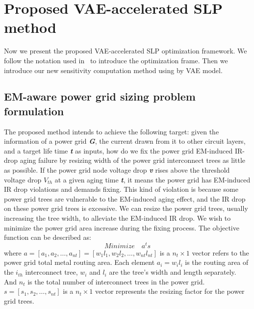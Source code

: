 \section{Proposed VAE-accelerated SLP method}
\label{sec:strategy}

Now we present the proposed VAE-accelerated SLP optimization
framework.  We follow the notation used in~\cite{Sukharev:2019pg} to
introduce the optimization frame. Then we introduce our new sensitivity
computation method using by VAE model.

\subsection{EM-aware power grid sizing problem formulation}
\label{subsec:formulation}


The proposed method intends to achieve the following target: given the information of a power grid \textit{\textbf{G}}, the current drawn from it to other circuit layers, and a target life time \textit{\textbf{t}} as inputs, how do we fix the power grid EM-induced IR-drop aging failure by resizing width of the power grid interconnect trees as little as possible.
 If the power grid node voltage drop \textit{\textbf{v}} rises above
the threshold voltage drop $V_{th}$ at a given aging time
\textit{\textbf{t}}, it means the power grid has EM-induced IR drop
violations and demands fixing. This kind of violation is because some
power grid trees are vulnerable to the EM-induced aging effect, and
the IR drop on these power grid trees is excessive.  We can resize the
power grid trees, usually increasing the tree width, to alleviate the
EM-induced IR drop. We wish to minimize the power grid area increase
during the fixing process. The objective function can be described as:
\begin{equation}
\label{eq:obj_func}
    Minimize \quad a^{t}s
  \end{equation}
  where
  $a=[a_{1},a_{2},\ldots,a_{nt}]=[w_{1}l_{1},
  w_{2}l_{2},\ldots,w_{nt}l_{nt}]$ is a $n_{t} \times 1$ vector
  refers to the power grid total metal routing area. Each element
  $a_{i}=w_{i}l_{i}$ is the routing area of the $i_{th}$ interconnect
  tree, $w_{i}$ and $l_{i}$ are the tree's width and length
  separately. And $n_{t}$ is the total number of interconnect trees in
  the power grid. $s=[s_{1},s_{2},\ldots,s_{nt}]$ is a
  $n_{t} \times 1$ vector represents the resizing factor for the power
  grid trees.

